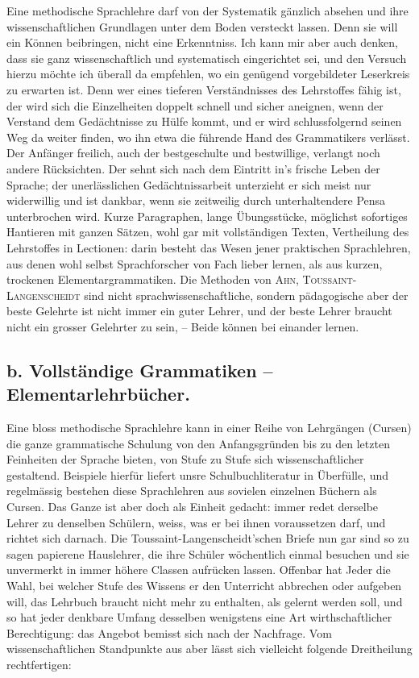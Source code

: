 Eine methodische Sprachlehre darf von der Systematik gänzlich absehen und ihre wissenschaftlichen Grundlagen unter dem Boden versteckt lassen. Denn sie will ein Können beibringen, nicht eine Erkenntniss. Ich kann mir aber auch denken, dass sie ganz wissenschaftlich und systematisch eingerichtet sei, und den Versuch hierzu möchte ich überall da empfehlen, wo ein genügend vorgebildeter Leserkreis zu erwarten ist. Denn wer eines tieferen Verständnisses des Lehrstoffes fähig ist, der wird sich die Einzelheiten doppelt schnell und sicher aneignen, wenn der Verstand dem Gedächtnisse zu Hülfe kommt, und er wird schlussfolgernd seinen Weg da weiter finden, wo ihn etwa die führende Hand des Grammatikers verlässt. Der Anfänger freilich, auch der bestgeschulte und bestwillige, verlangt noch andere Rücksichten. Der sehnt sich nach dem Eintritt in’s frische Leben der Sprache; der unerlässlichen Gedächtnissarbeit unterzieht er sich meist nur widerwillig und ist dankbar, wenn sie zeitweilig durch unterhaltendere Pensa unterbrochen wird. Kurze Paragraphen, lange Übungsstücke, möglichst sofortiges Hantieren mit ganzen Sätzen, wohl gar mit vollständigen Texten, Ver\-theilung des Lehrstoffes in Lectionen: darin besteht das Wesen jener praktischen Sprachlehren, aus denen wohl selbst Sprachforscher von Fach lieber lernen, als aus kurzen, trockenen Elementargrammatiken. Die Methoden von \textsc{Ahn},  \textsc{Toussaint-Langenscheidt} sind nicht sprachwissenschaftliche, sondern pädagogische  aber der beste Gelehrte ist nicht immer ein guter Lehrer, und der beste Lehrer braucht nicht ein grosser Gelehrter zu sein, – Beide können bei einander lernen.

\label{fp.116}

\subsection*{b. Vollständige Grammatiken – Elementarlehrbücher.}
Eine bloss methodische Sprachlehre kann in einer Reihe von Lehrgängen (Cursen) die ganze grammatische Schulung von den Anfangsgründen bis zu den \label{sp.111} letzten Feinheiten der Sprache bieten, von Stufe zu Stufe sich wissenschaftlicher gestaltend. Beispiele hierfür liefert unsre Schulbuchliteratur in Überfülle, und regelmässig bestehen diese Sprachlehren aus sovielen einzelnen Büchern als Cursen. Das Ganze ist aber doch als Einheit gedacht: immer redet derselbe Lehrer zu denselben Schülern, weiss, was er bei ihnen voraussetzen darf, und richtet sich darnach. Die Toussaint-Langenscheidt’schen Briefe nun gar sind so zu sagen papierene Hauslehrer, die ihre Schüler wöchentlich einmal besuchen und sie unvermerkt in immer höhere Classen aufrücken lassen. Offenbar hat Jeder die Wahl, bei welcher Stufe des Wissens er den Unterricht abbrechen oder aufgeben will, das Lehrbuch braucht nicht mehr zu enthalten, als gelernt werden soll, und so hat jeder denkbare Umfang desselben wenigstens eine Art wirthschaftlicher Berechtigung: das Angebot bemisst sich nach der Nachfrage. Vom wissenschaftlichen Standpunkte aus aber lässt sich vielleicht folgende Dreitheilung rechtfertigen:
 
